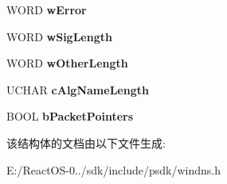 \begin{DoxyCompactItemize}
W\+O\+RD {\bfseries w\+Error}
\item 
\mbox{\label{struct_d_n_s___t_s_i_g___d_a_t_a_w_a514528a0a32cd43892e238f3b600fb5c}} 
W\+O\+RD {\bfseries w\+Sig\+Length}
\item 
\mbox{\label{struct_d_n_s___t_s_i_g___d_a_t_a_w_ace40ef528b226b0ed90e27e9636b17dd}} 
W\+O\+RD {\bfseries w\+Other\+Length}
\item 
\mbox{\label{struct_d_n_s___t_s_i_g___d_a_t_a_w_ade613d8ff1d5e9cc58ff3fa54620e0d6}} 
U\+C\+H\+AR {\bfseries c\+Alg\+Name\+Length}
\item 
\mbox{\label{struct_d_n_s___t_s_i_g___d_a_t_a_w_a48a9a2cf86f792183864a59c76c95737}} 
B\+O\+OL {\bfseries b\+Packet\+Pointers}
\end{DoxyCompactItemize}


该结构体的文档由以下文件生成\+:\begin{DoxyCompactItemize}
\item 
E\+:/\+React\+O\+S-\/0../sdk/include/psdk/windns.\+h\end{DoxyCompactItemize}

